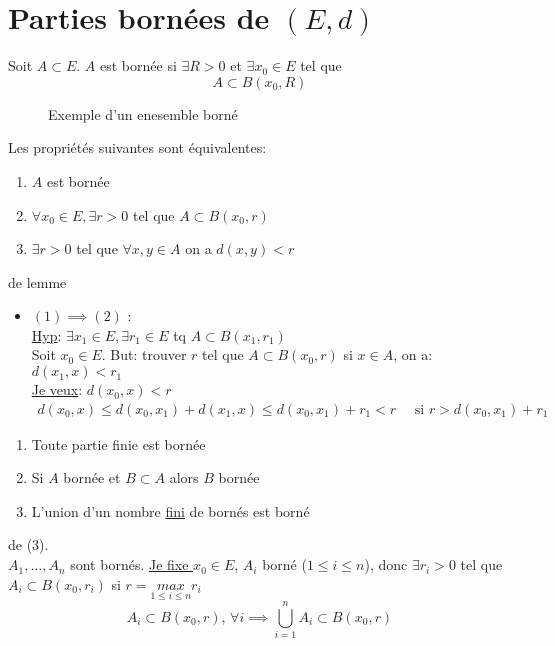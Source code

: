 \section{Parties bornées de $(E, d)$}
\begin{definition}
    Soit $A \subset E$. $A$ est bornée si  $\exists R > 0$ et $\exists x_0 \in E$ tel que 
    \[
    A \subset B(x_0, R)
    \] 
\end{definition}
\begin{figure}[H]
    \centering
    \caption{Exemple d'un enesemble borné}
    \label{fig:exemple-bornee}
\end{figure}
\begin{lemma}
   Les propriétés suivantes sont équivalentes:
   \begin{enumerate}
       \item $A$ est bornée
       \item  $\forall x_0 \in E, \exists r > 0$ tel que $A \subset B(x_0, r)$
       \item $\exists r > 0$ tel que $\forall x, y \in A$ on a $d(x, y) < r$
   \end{enumerate}
\end{lemma}
\begin{explanation} de lemme
   \begin{itemize}
       \item $(1) \implies (2)$ :\\
           \underline{Hyp}: $\exists x_1 \in E, \exists r_1 \in E$ tq $A \subset B(x_1, r_1)$\\
           Soit $x_0 \in E$. But: trouver $r$ tel que  $A \subset B(x_0, r)$ si $x \in A$, on a:  $d(x_1, x) < r_1$\\
           \underline{Je veux}: $d(x_0, x) <r$\\
          \begin{align*}
              d(x_0, x) \le d(x_0, x_1) + d(x_1, x) \le d(x_0, x_1) + r_1 < r \quad \text{ si } r > d(x_0, x_1) + r_1
          \end{align*} 
   \end{itemize} 
\end{explanation}
\begin{property}
   \begin{enumerate}
       \item Toute partie finie est bornée
       \item Si $A$ bornée et  $B \subset A$ alors $B$ bornée
       \item L'union d'un nombre \underline{fini} de bornés est borné
   \end{enumerate} 
\end{property}
\begin{preuve}{de (3).}\\
    $A_1, \ldots, A_n$ sont bornés. \underline{Je fixe $x_0 \in E$}, $A_i$ borné ($1 \le i \le n$), donc $\exists r_i > 0$ tel que $A_i \subset B(x_0, r_i)$ si $r = \underset{1 \le  i \le n}{max} r_i$ 
    \[
        A_i \subset B(x_0, r), \, \forall i \implies \bigcup\limits_{i=1}^{n} A_i \subset B(x_0, r)
    \] 
\end{preuve}
